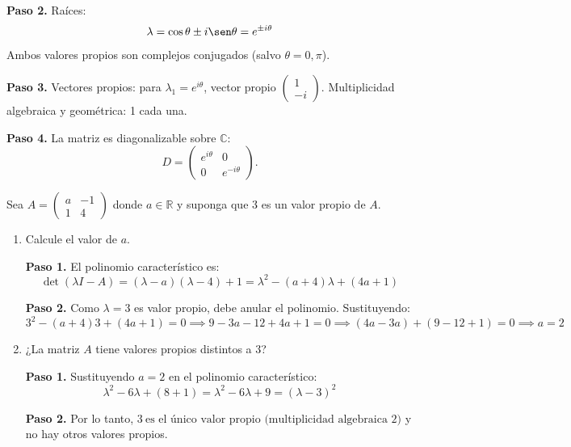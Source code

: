 \begin{prob}
\begin{enumerate}[$a)$]
\begin{myproof}
\textbf{Paso 2.} Raíces:
\[
\lambda = \cos\theta \pm i\sen\theta = e^{\pm i\theta}
\]
Ambos valores propios son complejos conjugados (salvo $\theta=0,\pi$).

\textbf{Paso 3.} Vectores propios: para $\lambda_1 = e^{i\theta}$, vector propio $\begin{pmatrix} 1 \\ -i \end{pmatrix}$. Multiplicidad algebraica y geométrica: 1 cada una.

\textbf{Paso 4.} La matriz es diagonalizable sobre $\mathbb{C}$:
\[
\boxed{D = \begin{pmatrix} e^{i\theta} & 0 \\ 0 & e^{-i\theta} \end{pmatrix}.}
\]
\end{myproof}

\end{enumerate}
\end{prob}

\begin{prob}
Sea $A=\left( \begin{array}{cc} a&-1 \\ 1&4 \end{array} \right)$ donde $a\in \mathbb{R}$ y suponga que $3$ es un valor propio de $A.$ 
\begin{enumerate}[$a)$]
\item Calcule el valor de $a.$
\begin{myproof}
\textbf{Paso 1.} El polinomio característico es:
\[
\det(\lambda I - A) = (\lambda-a)(\lambda-4) + 1 = \lambda^2 - (a+4)\lambda + (4a+1)
\]

\textbf{Paso 2.} Como $\lambda=3$ es valor propio, debe anular el polinomio. Sustituyendo:
\[
3^2 - (a+4)3 + (4a+1) = 0 \implies 9 - 3a - 12 + 4a + 1 = 0 \implies (4a-3a) + (9-12+1) = 0 \implies \boxed{a=2}
\]
\end{myproof}

\item ¿La matriz $A$ tiene valores propios distintos a $3$?
\begin{myproof}
\textbf{Paso 1.} Sustituyendo $a=2$ en el polinomio característico:
\[
\lambda^2 - 6\lambda + (8+1) = \lambda^2 - 6\lambda + 9 = (\lambda-3)^2
\]

\textbf{Paso 2.} Por lo tanto, $\boxed{3\ \text{es el único valor propio (multiplicidad algebraica 2)}}$ y no hay otros valores propios.
\end{myproof}
\end{enumerate}
\end{prob}

